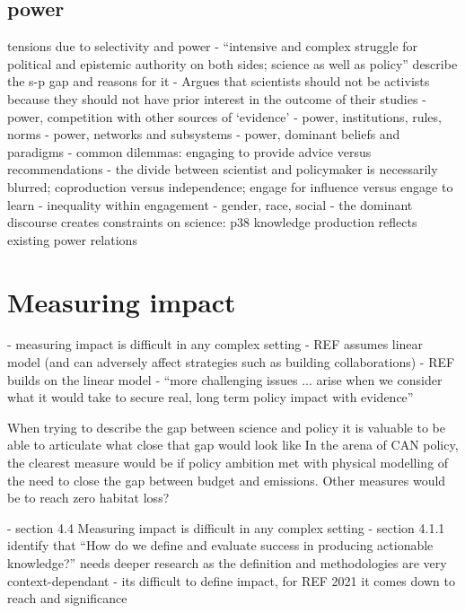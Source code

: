 \subsection{power}
\cite{StrassheimK2014} tensions due to selectivity and power - ``intensive and complex struggle for political and epistemic authority on both sides; science as well as policy''
\cite{OlejniczakBDP2019} describe the s-p gap and reasons for it
\cite{Buntgen2024} - Argues that scientists should not be activists because they should not have prior interest in the outcome of their studies
\cite{CairneyO2020} - power, competition with other sources of `evidence'
\cite{CairneyO2020} - power, institutions, rules, norms
\cite{CairneyO2020} - power, networks and subsystems
\cite{CairneyO2020} - power, dominant beliefs and paradigms
\cite{CairneyO2020} - common dilemmas: engaging to provide advice versus recommendations - the divide between scientist and policymaker is necessarily blurred; coproduction versus independence; engage for influence versus engage to learn 
\cite{CairneyO2020} - inequality within engagement - gender, race, social
\cite{Carton2021} - the dominant discourse creates constraints on science: p38 knowledge production reflects existing power relations


\section{Measuring impact}
\cite{BednarekSHG2015} - measuring impact is difficult in any complex setting
\cite{BoswellS2017} - REF assumes linear model (and can adversely affect strategies such as building collaborations)
\cite{Cairney2018} - REF builds on the linear model
\cite{CairneyO2020} - ``more challenging issues ... arise when we consider what it would take to secure real, long term policy impact with evidence''


When trying to describe the gap between science and policy it is valuable to be able to articulate what close that gap would look like
In the arena of CAN policy, the clearest measure would be if policy ambition met with physical modelling of the need to close the gap between budget and emissions. Other measures would be to reach zero habitat loss? 

\cite{BednarekSHG2015} - section 4.4 Measuring impact is difficult in any complex setting 
\cite{JagannathanEtAl2023} - section 4.1.1 identify that ``How do we define and evaluate success in producing actionable knowledge?'' needs deeper research as the definition and methodologies are very context-dependant
\cite{KEU2021impact} - its difficult to define impact, for REF 2021 it comes down to reach and significance

